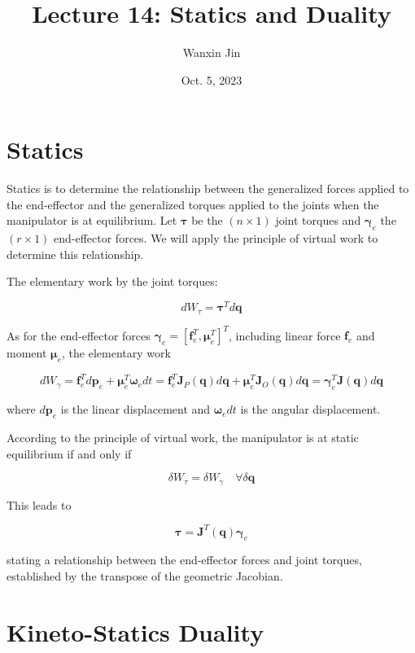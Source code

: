 \documentclass[10pt]{article}
\begin{document}
\title{Lecture 14: Statics and Duality}
\date{Oct. 5, 2023}
\author{Wanxin Jin}
\maketitle


\section{Statics}
Statics is to determine the relationship between the generalized forces applied to the end-effector and the generalized torques applied to the joints when the manipulator is at equilibrium. Let $\boldsymbol{\tau}$ be the $(n \times 1)$ joint torques and $\boldsymbol{\gamma}_{e}$ the $(r \times 1)$ end-effector forces. 
We will apply the principle of virtual work to determine this relationship. 

The elementary work by the joint torques:

$$
d W_{\tau}=\boldsymbol{\tau}^{T} d \boldsymbol{q}
$$



As for the end-effector forces  $\boldsymbol{\gamma}_{e}=\left[\boldsymbol{f}_{e}^{T} ,\boldsymbol{\mu}_{e}^{T}\right]^{T}$, including linear force $\boldsymbol{f}_{e}$ and moment  $\boldsymbol{\mu}_{e}$, the elementary work 

$$
d W_{\gamma}=\boldsymbol{f}_{e}^{T} d \boldsymbol{p}_{e}+\boldsymbol{\mu}_{e}^{T} \boldsymbol{\omega}_{e} d t =\boldsymbol{f}_{e}^{T} \boldsymbol{J}_{P}(\boldsymbol{q}) d \boldsymbol{q}+\boldsymbol{\mu}_{e}^{T} \boldsymbol{J}_{O}(\boldsymbol{q}) d \boldsymbol{q}  =\boldsymbol{\gamma}_{e}^{T} \boldsymbol{J}(\boldsymbol{q}) d \boldsymbol{q}
$$

where $d \boldsymbol{p}_{e}$ is the linear displacement and $\boldsymbol{\omega}_{e} d t$ is the angular displacement.

According to the principle of virtual work, the manipulator is at static equilibrium if and only if

$$
\delta W_{\tau}=\delta W_{\gamma} \quad \forall \delta \boldsymbol{q}
$$

This leads to



$$
\boldsymbol{\tau}=\boldsymbol{J}^{T}(\boldsymbol{q}) \boldsymbol{\gamma}_{e}
$$

stating a relationship between the end-effector forces and  joint torques, established by the transpose of the geometric Jacobian.

\section{Kineto-Statics Duality}
\end{document}
